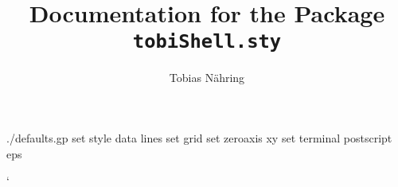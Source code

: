 \immediate{}
\begin{filecontents*}{./defaults.gp}
set style data lines
set grid
set zeroaxis xy
set terminal postscript eps
\end{filecontents*}
\def\red{\color{red}}
{
  \catcode`\@\active
  \gdef\makeatactive{\catcode`\@\active}
}
\def\switch#1{%
  \expandafter\ifx\csname switch\string#1\endcsname\relax%
  \iftrue{\else}\fi%
    \expandafter\def\csname switch\string#1\endcsname{\relax}%
    #1%
  \else%
  \iffalse{\else}\fi%
  \fi%
}
\documentclass{article}
\usepackage{graphicx}
\usepackage{amsmath}
\usepackage[DIV15]{typearea}
\usepackage{color}
\usepackage{tobiShell}
\parindent0pt
\parskip1pt

\title{Documentation for the Package \protect\tt tobiShell.sty}
\author{Tobias N{\"a}hring}
\maketitle
\tableofcontents
\section{Introduction}
The package \texttt{tobiShell.sty}\footnote{The prefix \mbox{\tt tobi}
  has been chosen to make the package name unique. There are just too many
  files named  \mbox{\tt shell.tex} in the net.} allows to include script
files for external programs within \LaTeX{} documents. Inlined code is
written to temporary files and the external program is called with the
file name of the script as the last command line argument.

The default external program is the \texttt{bash}-shell. You may
easily change the default program (e.g. to gnuplot) or specify some
other executable for some given inline script.

The package has been written and tested for \texttt{Linux}. Maybe,
with some modifications it runs also under other operating systems.
\section{Installation}
Copy \texttt{tobiShell.sty} to some place where \LaTeX{} finds it.
A good location is your personal \texttt{texmf} tree
(e.g.~\verb=~/texmf/tex/latex/tobiShell.sty=).

For security reasons \TeX{} does not run external programs from input
files by default. This behavior can be changed by setting the
variable \verb=shell_escape= in \texttt{/etc/texmf/texmf.cnf} to
\texttt{t}. You should not do so because of it is a
{\color{red}security risk}! It enables also mailware possibly hidden
in some down-loaded \TeX{} document.

